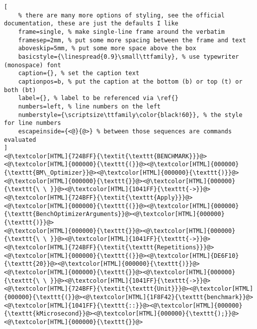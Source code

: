 \begin{lstlisting}[
	% there are many more options of styling, see the official documentation, these are just the defaults I like
	frame=single, % make single-line frame around the verbatim
	framesep=2mm, % put some more spacing between the frame and text
	aboveskip=5mm, % put some more space above the box
	basicstyle={\linespread{0.9}\small\ttfamily}, % use typewriter (monospace) font
	caption={}, % set the caption text
	captionpos=b, % put the caption at the bottom (b) or top (t) or both (bt)
    label={}, % label to be referenced via \ref{}
	numbers=left, % line numbers on the left
	numberstyle={\scriptsize\ttfamily\color{black!60}}, % the style for line numbers
	escapeinside={<@}{@>} % between those sequences are commands evaluated
]
<@\textcolor[HTML]{724BFF}{\textit{\texttt{BENCHMARK}}}@><@\textcolor[HTML]{000000}{\texttt{(}}@><@\textcolor[HTML]{000000}{\texttt{BM\_Optimizer}}@><@\textcolor[HTML]{000000}{\texttt{)}}@>
<@\textcolor[HTML]{000000}{\texttt{}}@><@\textcolor[HTML]{000000}{\texttt{\ \ }}@><@\textcolor[HTML]{1041FF}{\texttt{->}}@><@\textcolor[HTML]{724BFF}{\textit{\texttt{Apply}}}@><@\textcolor[HTML]{000000}{\texttt{(}}@><@\textcolor[HTML]{000000}{\texttt{BenchOptimizerArguments}}@><@\textcolor[HTML]{000000}{\texttt{)}}@>
<@\textcolor[HTML]{000000}{\texttt{}}@><@\textcolor[HTML]{000000}{\texttt{\ \ }}@><@\textcolor[HTML]{1041FF}{\texttt{->}}@><@\textcolor[HTML]{724BFF}{\textit{\texttt{Repetitions}}}@><@\textcolor[HTML]{000000}{\texttt{(}}@><@\textcolor[HTML]{DE6F10}{\texttt{20}}@><@\textcolor[HTML]{000000}{\texttt{)}}@>
<@\textcolor[HTML]{000000}{\texttt{}}@><@\textcolor[HTML]{000000}{\texttt{\ \ }}@><@\textcolor[HTML]{1041FF}{\texttt{->}}@><@\textcolor[HTML]{724BFF}{\textit{\texttt{Unit}}}@><@\textcolor[HTML]{000000}{\texttt{(}}@><@\textcolor[HTML]{1F8F42}{\texttt{benchmark}}@><@\textcolor[HTML]{1041FF}{\texttt{::}}@><@\textcolor[HTML]{000000}{\texttt{kMicrosecond}}@><@\textcolor[HTML]{000000}{\texttt{);}}@>
<@\textcolor[HTML]{000000}{\texttt{}}@>
\end{lstlisting}